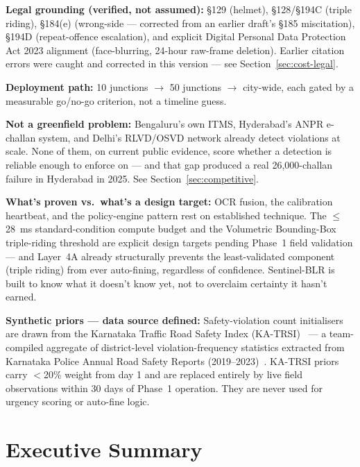 \documentclass[11pt,a4paper]{article}
\begin{document}
\begin{callout}
\textbf{Legal grounding (verified, not assumed):} \S129 (helmet), \S128/\S194C (triple riding), \S184(e) (wrong-side --- corrected from an earlier draft's \S185 miscitation), \S194D (repeat-offence escalation), and explicit Digital Personal Data Protection Act 2023 alignment (face-blurring, 24-hour raw-frame deletion). Earlier citation errors were caught and corrected in this version --- see Section~\ref{sec:cost-legal}.

\textbf{Deployment path:} 10 junctions $\rightarrow$ 50 junctions $\rightarrow$ city-wide, each gated by a measurable go/no-go criterion, not a timeline guess.

\textbf{Not a greenfield problem:} Bengaluru's own ITMS, Hyderabad's ANPR e-challan system, and Delhi's RLVD/OSVD network already detect violations at scale. None of them, on current public evidence, score whether a detection is reliable enough to enforce on --- and that gap produced a real 26,000-challan failure in Hyderabad in 2025. See Section~\ref{sec:competitive}.

\vspace{0.3em}
\textbf{What's proven vs.\ what's a design target:} OCR fusion, the calibration heartbeat, and the policy-engine pattern rest on established technique. The $\leq$28~ms standard-condition compute budget and the Volumetric Bounding-Box triple-riding threshold are explicit design targets pending Phase~1 field validation --- and Layer~4A already structurally prevents the least-validated component (triple riding) from ever auto-fining, regardless of confidence. Sentinel-BLR is built to know what it doesn't know yet, not to overclaim certainty it hasn't earned.

\vspace{0.3em}
\textbf{Synthetic priors --- data source defined:} Safety-violation count initialisers are drawn from the Karnataka Traffic Road Safety Index (KA-TRSI)~\cite{katrsi2023} --- a team-compiled aggregate of district-level violation-frequency statistics extracted from Karnataka Police Annual Road Safety Reports (2019--2023)~\cite{katrsi2023}. KA-TRSI priors carry $<$20\% weight from day 1 and are replaced entirely by live field observations within 30 days of Phase~1 operation. They are never used for urgency scoring or auto-fine logic.

\end{callout}


\section{Executive Summary}
\end{document}
